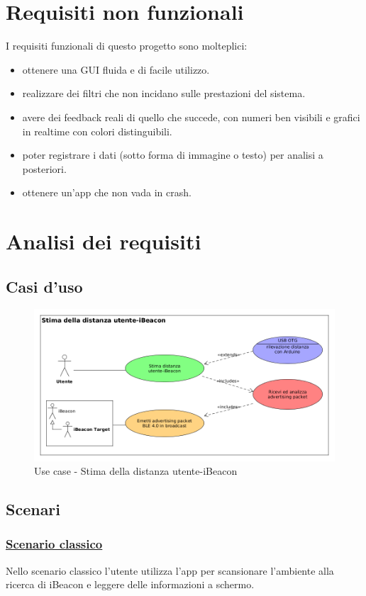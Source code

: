 \section{Requisiti non funzionali}
I requisiti funzionali di questo progetto sono molteplici:
\begin{itemize}
	\item ottenere una GUI fluida e di facile utilizzo.
	\item realizzare dei filtri che non incidano sulle prestazioni del sistema.
	\item avere dei feedback reali di quello che succede, con numeri ben visibili e grafici in realtime con colori distinguibili.
	\item poter registrare i dati (sotto forma di immagine o testo) per analisi a posteriori.
	\item ottenere un'app che non vada in crash.
\end{itemize}

\section{Analisi dei requisiti}
\subsection{Casi d'uso}
\begin{figure}[ph]
	\centering
	\includegraphics[scale=.45]{img/uml/use_case/use_case1}
	\caption[Use case - Stima della distanza utente-iBeacon]{Use case - Stima della distanza utente-iBeacon}
	\label{fig:usecase}
\end{figure}

\subsection{Scenari}

\subsubsection{\underline{Scenario classico}}
Nello scenario classico l'utente utilizza l'app per scansionare l'ambiente alla ricerca di iBeacon e leggere delle informazioni a schermo.

